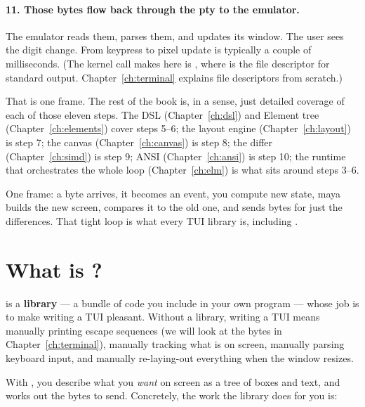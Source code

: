 \paragraph{11. Those bytes flow back through the pty to the emulator.}
The emulator reads them, parses them, and updates its window. The
user sees the digit change. From keypress to pixel update is
typically a couple of milliseconds. (The kernel call \maya{}
makes here is , where  is the file
descriptor for standard output. Chapter~\ref{ch:terminal} explains
file descriptors from scratch.)

That is one frame. The rest of the book is, in a sense, just
detailed coverage of each of those eleven steps. The DSL
(Chapter~\ref{ch:dsl}) and Element tree
(Chapter~\ref{ch:elements}) cover steps 5--6; the layout engine
(Chapter~\ref{ch:layout}) is step 7; the canvas
(Chapter~\ref{ch:canvas}) is step 8; the differ
(Chapter~\ref{ch:simd}) is step 9; ANSI
(Chapter~\ref{ch:ansi}) is step 10; the runtime that orchestrates
the whole loop (Chapter~\ref{ch:elm}) is what sits around steps
3--6.

\begin{idea}
One frame: a byte arrives, it becomes an event, you compute new
state, maya builds the new screen, compares it to the old one, and
sends bytes for just the differences. That tight loop is what every
TUI library is, including \maya{}.
\end{idea}

\section{What is \maya{}?}

\maya{} is a \cpp{} \textbf{library} --- a bundle of code you include
in your own program --- whose job is to make writing a TUI pleasant.
Without a library, writing a TUI means manually printing escape
sequences (we will look at the bytes in Chapter~\ref{ch:terminal}),
manually tracking what is on screen, manually parsing keyboard input,
and manually re-laying-out everything when the window resizes.

With \maya{}, you describe what you \emph{want} on screen as a tree of
boxes and text, and \maya{} works out the bytes to send. Concretely,
the work the library does for you is:

